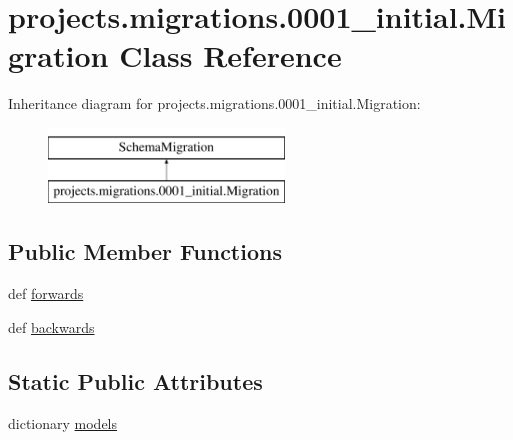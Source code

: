 \hypertarget{classprojects_1_1migrations_1_10001__initial_1_1_migration}{\section{projects.\-migrations.0001\-\_\-initial.Migration Class Reference}
\label{classprojects_1_1migrations_1_10001__initial_1_1_migration}
}
Inheritance diagram for projects.\-migrations.0001\-\_\-initial.Migration\-:\begin{figure}[H]
\begin{center}
\leavevmode
\includegraphics[height=2.000000cm]{classprojects_1_1migrations_1_10001__initial_1_1_migration}
\end{center}
\end{figure}
\subsection*{Public Member Functions}
\begin{DoxyCompactItemize}
\item 
def \hyperlink{classprojects_1_1migrations_1_10001__initial_1_1_migration_ae8e200b844460da115d3d996b7177d1d}{forwards}
\item 
def \hyperlink{classprojects_1_1migrations_1_10001__initial_1_1_migration_a126cab56edc3db37c951805c1445a4be}{backwards}
\end{DoxyCompactItemize}
\subsection*{Static Public Attributes}
\begin{DoxyCompactItemize}
\item 
dictionary \hyperlink{classprojects_1_1migrations_1_10001__initial_1_1_migration_a832186aa55199c68090347fe77492b70}{models}
\end{DoxyCompactItemize}


